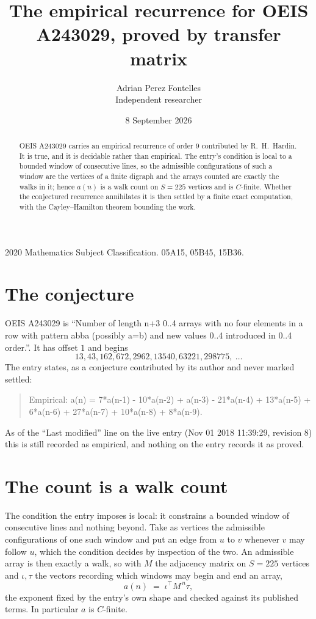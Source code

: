 \documentclass[11pt,a4paper]{article}
\title{The empirical recurrence for OEIS A243029, proved by transfer matrix}
\author{Adrian Perez Fontelles\\ \small Independent researcher}
\date{8 September 2026}
\theoremstyle{plain}
\theoremstyle{definition}
\begin{document}
\maketitle

\begin{abstract}
OEIS A243029 carries an empirical recurrence of order $9$ contributed by R.~H.~Hardin. It is
true, and it is decidable rather than empirical. The entry's condition is local to a bounded window of consecutive lines, so
the admissible configurations of such a window are the vertices of a finite digraph and the
arrays counted are exactly the walks in it; hence $a(n)$ is a walk count on $S=225$ vertices
and is $C$-finite. Whether the conjectured recurrence annihilates it is then settled by a
finite exact computation, with the Cayley--Hamilton theorem bounding the work.
\end{abstract}

\noindent\small 2020 Mathematics Subject Classification. 05A15, 05B45, 15B36.\normalsize

\section{The conjecture}

OEIS A243029 is ``Number of length n+3 0..4 arrays with no four elements in a row with pattern abba (possibly a=b) and new values 0..4 introduced in 0..4 order.''. It has offset $1$ and begins
\[
13, 43, 162, 672, 2962, 13540, 63221, 298775,\ \dots
\]
The entry states, as a conjecture contributed by its author and never marked settled:
\begin{quote}
Empirical: a(n) = 7*a(n-1) - 10*a(n-2) + a(n-3) - 21*a(n-4) + 13*a(n-5) + 6*a(n-6) + 27*a(n-7) + 10*a(n-8) + 8*a(n-9).
\end{quote}
As of the ``Last modified'' line on the live entry (Nov 01 2018 11:39:29, revision 8) this is still
recorded as empirical, and nothing on the entry records it as proved.

\section{The count is a walk count}

The condition the entry imposes is local: it constrains a bounded window of consecutive lines and nothing beyond. Take as
vertices the admissible configurations of one such window and put an edge from $u$ to $v$
whenever $v$ may follow $u$, which the condition decides by inspection of the two. An
admissible array is then exactly a walk, so with $M$ the adjacency matrix on $S=225$ vertices
and $\iota,\tau$ the vectors recording which windows may begin and end an array,
\[
a(n)\;=\;\iota^{\!\top}M^{\,n}\tau ,
\]
the exponent fixed by the entry's own shape and checked against its published terms. In
particular $a$ is $C$-finite.
\end{document}
